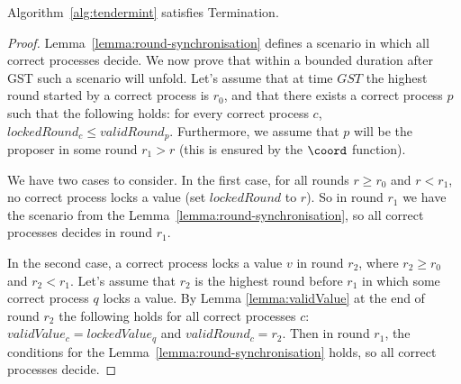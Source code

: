 \begin{lemma} \label{lemma:agreement} Algorithm~\ref{alg:tendermint} satisfies
Termination.  \end{lemma}

\begin{proof} Lemma~\ref{lemma:round-synchronisation} defines a scenario in
    which all correct processes decide. We now prove that within a bounded
    duration after GST such a scenario will unfold. Let's assume that at time
    $GST$ the highest round started by a correct process is $r_0$, and that
    there exists a correct process $p$ such that the following holds: for every
    correct process $c$, $lockedRound_c \le validRound_p$. Furthermore, we
    assume that $p$ will be the proposer in some round $r_1 > r$ (this is
    ensured by the $\coord$ function). 

We have two cases to consider. In the first case, for all rounds $r \ge r_0$
and $r < r_1$, no correct process locks a value (set $lockedRound$ to $r$). So
in round $r_1$ we have the scenario from the
Lemma~\ref{lemma:round-synchronisation}, so all correct processes decides in
round $r_1$.  

In the second case, a correct process locks a value $v$ in round $r_2$, where
$r_2 \ge r_0$ and $r_2 < r_1$.  Let's assume that $r_2$ is the highest round
before $r_1$ in which some correct process $q$ locks a value. By Lemma
\ref{lemma:validValue} at the end of round $r_2$ the following holds for all
correct processes $c$: $validValue_c = lockedValue_q$ and $validRound_c = r_2$.
Then in round $r_1$, the conditions for the
Lemma~\ref{lemma:round-synchronisation} holds, so all correct processes decide.
\end{proof}	

